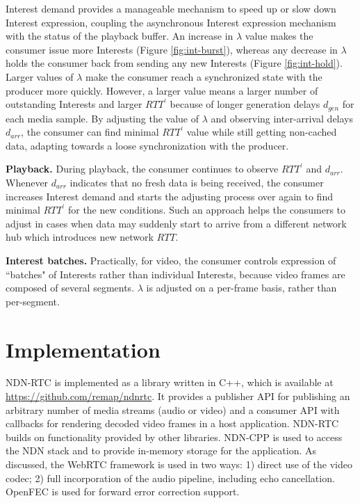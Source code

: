 \documentclass{icn/sig-alternate-2013} %
\newcommand{\ndnrtcName}{NDN-RTC} %
\newcommand{\wConcept}{Interest demand}
\begin{document}
\wConcept{} provides a manageable mechanism to speed up or slow down Interest expression, coupling the asynchronous Interest expression mechanism with the status of the playback buffer. An increase in $\lambda$ value makes the consumer issue more Interests (Figure \ref{fig:int-burst}), whereas any decrease in $\lambda$ holds the consumer back from sending any new Interests (Figure \ref{fig:int-hold}). Larger values of $\lambda$ make the consumer reach a synchronized state with the producer more quickly. However, a larger value means a larger number of outstanding Interests and larger $RTT^\prime$ because of longer generation delays $d_{gen}$ for each media sample. By adjusting the value of $\lambda$ and observing inter-arrival delays $d_{arr}$, the consumer can find minimal $RTT^\prime$ value while still getting non-cached data, adapting towards a loose synchronization with the producer.

\textbf{Playback.}  During playback, the consumer continues to observe $RTT^\prime$ and $d_{arr}$. Whenever $d_{arr}$ indicates that no fresh data is being received, the consumer increases \wConcept{} and starts the adjusting process over again to find minimal $RTT^\prime$ for the new conditions. Such an approach helps the consumers to adjust in cases when data may suddenly start to arrive from a different network hub which introduces new network $RTT$.

\textbf{Interest batches.} Practically, for video, the consumer controls expression of ``batches" of Interests rather than individual Interests, because video frames are composed of several segments.  $\lambda$ is adjusted on a per-frame basis, rather than per-segment. 

\section{Implementation}
\label{sec:imp}
\ndnrtcName{} is implemented as a library written in C++, which is available at \url{https://github.com/remap/ndnrtc}. 
It provides a publisher API for publishing an arbitrary number of media streams (audio or video) and a consumer API with callbacks for rendering decoded video frames in a host application. \ndnrtcName{} builds on functionality provided by other libraries. NDN-CPP \cite{ndnccl} is used to access the NDN stack and to provide in-memory storage for the application. As discussed, the WebRTC framework \cite{webrtc} is used in two ways: 1) direct use of the video codec; 2) full incorporation of the audio pipeline, including echo cancellation. OpenFEC \cite{openfec} is used for forward error correction support. 
\end{document}
